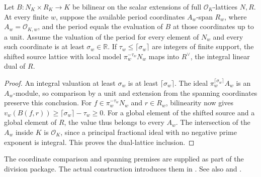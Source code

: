 \begin{proposition}\label{geo:shift}
Let \(B:N_K\times R_K\to K\) be bilinear on the scalar extensions of full \(\mathcal O_K\)-lattices \(N,R\). At every finite \(w\), suppose the available period coordinates \(A_w\)-span \(R_w\), where \(A_w=\mathcal O_{K,w}\), and the period equals the evaluation of \(B\) at those coordinates up to a unit. Assume the valuation of the period for every element of \(N_w\) and every such coordinate is at least \(\sigma_w\in\mathbb R\). If \(\tau_w\le\lceil\sigma_w\rceil\) are integers of finite support, the shifted source lattice with local model \(\pi_w^{-\tau_w}N_w\) maps into \(R^\vee\), the integral linear dual of \(R\).
\end{proposition}
\begin{proof}
An integral valuation at least \(\sigma_w\) is at least \(\lceil\sigma_w\rceil\). The ideal \(\pi_w^{\lceil\sigma_w\rceil}A_w\) is an \(A_w\)-module, so comparison by a unit and extension from the spanning coordinates preserve this conclusion. For \(f\in\pi_w^{-\tau_w}N_w\) and \(r\in R_w\), bilinearity now gives \(v_w(B(f,r))\ge\lceil\sigma_w\rceil-\tau_w\ge0\). For a global element of the shifted source and a global element of \(R\), the value thus belongs to every \(A_w\). The intersection of the \(A_w\) inside \(K\) is \(\mathcal O_K\), since a principal fractional ideal with no negative prime exponent is integral. This proves the dual-lattice inclusion.
\end{proof}

The coordinate comparison and spanning premises are supplied as part of the division package. The actual construction introduces them in . See also  and .

